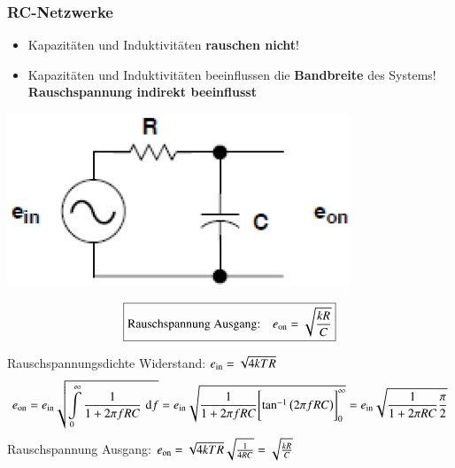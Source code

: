 \subsubsection{RC-Netzwerke}

\begin{itemize}
    \item Kapazitäten und Induktivitäten \textbf{rauschen nicht}!
    \item Kapazitäten und Induktivitäten beeinflussen die \textbf{Bandbreite} des Systems! \\
        \textbf{Rauschspannung indirekt beeinflusst}
\end{itemize}

\begin{minipage}[c]{0.28\columnwidth}
    \includegraphics[width=\columnwidth]{images/rc_rauschen.png}
\end{minipage}
\hfill
\begin{minipage}[c]{0.7\columnwidth}
    $$ \boxed{ \text{Rauschspannung Ausgang:} \quad e_{\rm on} = \sqrt{\frac{k R }{C}} } $$
\end{minipage}


    
Rauschspannungsdichte Widerstand: $e_{\rm in} = \sqrt{4 k T R}$
$$ e_{\rm on} = e_{\rm in} \sqrt{ \int\limits_{0}^{\infty} \frac{1}{1 + 2 \pi f R C} \, \mathop{} \! \mathrm{d} f }
    = e_{\rm in} \sqrt{\frac{1}{1 + 2 \pi f R C} \Biggl[ \tan^{-1}\big( 2 \pi f R C \big) \Biggr]_{0}^{\infty} } 
    = e_{\rm in} \sqrt{\frac{1}{1 + 2 \pi R C} \frac{\pi}{2} } $$
Rauschspannung Ausgang: \quad $e_{\rm on} = \sqrt{4 k T R} \sqrt{\frac{1}{4 R C}} = \sqrt{\frac{k R }{C}} $



